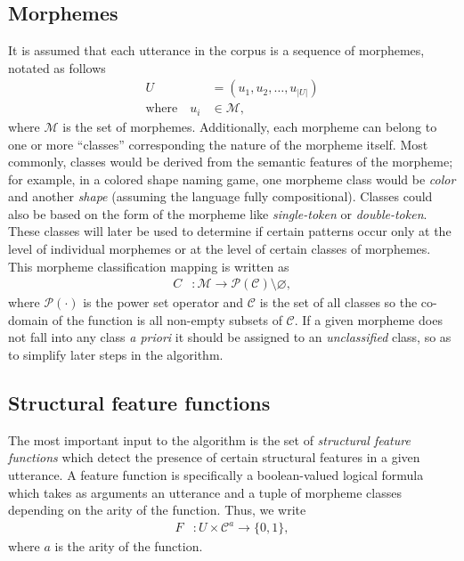 \subsection{Morphemes}
It is assumed that each utterance in the corpus is a sequence of morphemes, notated as follows
\begin{align}
  U &= (u_1, u_2, \dots, u_{|U|}) \\
  \text{where}\quad u_i &\in \mathcal M
  ,
\end{align}
where $\mathcal M$ is the set of morphemes.
Additionally, each morpheme can belong to one or more ``classes'' corresponding the nature of the morpheme itself.
Most commonly, classes would be derived from the semantic features of the morpheme;
  for example, in a colored shape naming game, one morpheme class would be \emph{color} and another \emph{shape} (assuming the language fully compositional).
Classes could also be based on the form of the morpheme like \emph{single-token} or \emph{double-token}.
These classes will later be used to determine if certain patterns occur only at the level of individual morphemes or at the level of certain classes of morphemes.
This morpheme classification mapping is written as
\begin{align}
  C &: \mathcal M \rightarrow \mathcal P(\mathcal C) \setminus \varnothing
  ,
\end{align}
where $\mathcal P(\cdot)$ is the power set operator and $\mathcal C$ is the set of all classes so the co-domain of the function is all non-empty subsets of $\mathcal C$.
If a given morpheme does not fall into any class \emph{a priori} it should be assigned to an \emph{unclassified} class, so as to simplify later steps in the algorithm.


\subsection{Structural feature functions}

The most important input to the algorithm is the set of \emph{structural feature functions} which detect the presence of certain structural features in a given utterance.
A feature function is specifically a boolean-valued logical formula which takes as arguments an utterance and a tuple of morpheme classes depending on the arity of the function.
Thus, we write
\begin{align}
  F &: U \times \mathcal C^a \rightarrow \{0,1\}
  ,
\end{align}
where $a$ is the arity of the function.

